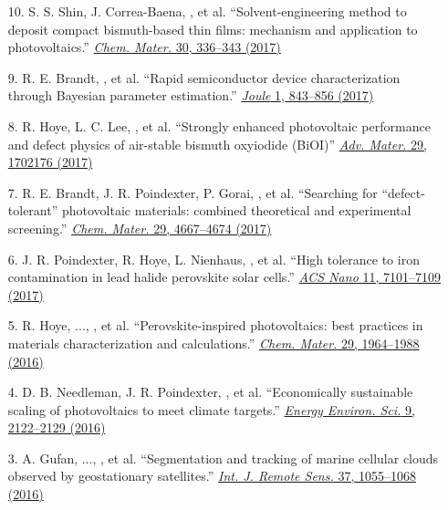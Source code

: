 \begin{enumerate}
        \item[10.] S. S. Shin, J. Correa-Baena, \myname, et al. ``Solvent-engineering method to deposit compact bismuth-based thin films: mechanism and application to photovoltaics.'' \href{https://pubs.acs.org/doi/10.1021/acs.chemmater.7b03227}{\textit{Chem. Mater.} 30, 336--343 (2017)}

        \item[9.] R. E. Brandt, \myname, et al. ``Rapid semiconductor device characterization through Bayesian parameter estimation.'' \href{https://www.sciencedirect.com/science/article/pii/S254243511730096X?via\%3Dihub}{\textit{Joule} 1, 843--856 (2017)}

        \item[8.] R. Hoye, L. C. Lee, \myname, et al. ``Strongly enhanced photovoltaic performance and defect physics of air-stable bismuth oxyiodide (BiOI)'' \href{https://onlinelibrary.wiley.com/doi/full/10.1002/adma.201702176}{\textit{Adv. Mater.} 29, 1702176 (2017)}        

        \item[7.] R. E. Brandt, J. R. Poindexter, P. Gorai, \myname, et al. ``Searching for “defect-tolerant” photovoltaic materials: combined theoretical and experimental screening.'' \href{https://pubs.acs.org/doi/10.1021/acs.chemmater.6b05496}{\textit{Chem. Mater.} 29, 4667--4674 (2017)}

        \item[6.] J. R. Poindexter, R. Hoye, L. Nienhaus, \myname, et al. ``High tolerance to iron contamination in lead halide perovskite solar cells.'' \href{https://pubs.acs.org/doi/10.1021/acsnano.7b02734}{\textit{ACS Nano} 11, 7101--7109 (2017)}

        \item[5.] R. Hoye, ..., \myname, et al. ``Perovskite-inspired photovoltaics: best practices in materials characterization and calculations.'' \href{https://pubs.acs.org/doi/10.1021/acs.chemmater.6b03852}{\textit{Chem. Mater.} 29, 1964--1988 (2016)}

        \item[4.] D. B. Needleman, J. R. Poindexter, \myname, et al. ``Economically sustainable scaling of photovoltaics to meet climate targets.'' \href{https://pubs.rsc.org/en/content/articlelanding/2016/EE/C6EE00484A}{\textit{Energy Environ. Sci.} 9, 2122--2129 (2016)}

        \item[3.] A. Gufan, ..., \myname, et al. ``Segmentation and tracking of marine cellular clouds observed by geostationary satellites.'' \href{https://www.tandfonline.com/doi/full/10.1080/2150704X.2016.1142681?cookieSet=1}{\textit{Int. J. Remote Sens.} 37, 1055--1068 (2016)}


\end{enumerate}
